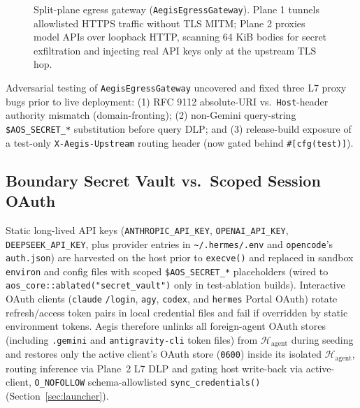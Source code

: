 \documentclass[10pt,journal,compsoc]{IEEEtran}
\begin{document}
\begin{figure}[!t]
{%
}
\vspace{-4pt}
\caption{Split-plane egress gateway (\texttt{Aegis\allowbreak Egress\allowbreak Gateway}). Plane 1 tunnels allowlisted HTTPS traffic without TLS MITM; Plane 2 proxies model APIs over loopback HTTP, scanning 64 KiB bodies for secret exfiltration and injecting real API keys only at the upstream TLS hop.}
\label{fig:egress}
\end{figure}

Adversarial testing of \texttt{AegisEgressGateway} uncovered and fixed three L7 proxy bugs prior to live deployment: (1) RFC 9112 absolute-URI vs.\ \texttt{Host}-header authority mismatch (domain-fronting); (2) non-Gemini query-string \texttt{\$AOS\_SECRET\_*} substitution before query DLP; and (3) release-build exposure of a test-only \texttt{X-Aegis-Upstream} routing header (now gated behind \texttt{\#[cfg(test)]}).

\subsection{Boundary Secret Vault vs.\ Scoped Session OAuth}

Static long-lived API keys (\texttt{ANTHROPIC\_API\_KEY}, \texttt{OPENAI\_API\_KEY}, \texttt{DEEPSEEK\_API\_KEY}, plus provider entries in \texttt{\textasciitilde/.hermes/.env} and \texttt{opencode}'s \texttt{auth.json}) are harvested on the host prior to \texttt{execve()} and replaced in sandbox \texttt{environ} and config files with scoped \texttt{\$AOS\_SECRET\_*} placeholders (wired to \texttt{aos\_core::ablated("secret\_vault")} only in test-ablation builds). Interactive OAuth clients (\texttt{claude} \texttt{/login}, \texttt{agy}, \texttt{codex}, and \texttt{hermes} Portal OAuth) rotate refresh/access token pairs in local credential files and fail if overridden by static environment tokens. Aegis therefore unlinks all foreign-agent OAuth stores (including \texttt{.gemini} and \texttt{antigravity-cli} token files) from $\mathcal{H}_{\text{agent}}$ during seeding and restores only the active client's OAuth store (\texttt{0600}) inside its isolated $\mathcal{H}_{\text{agent}}$, routing inference via Plane~2 L7 DLP and gating host write-back via active-client, \texttt{O\_NOFOLLOW} schema-allowlisted \texttt{sync\_credentials()} (Section~\ref{sec:launcher}).
\end{document}
